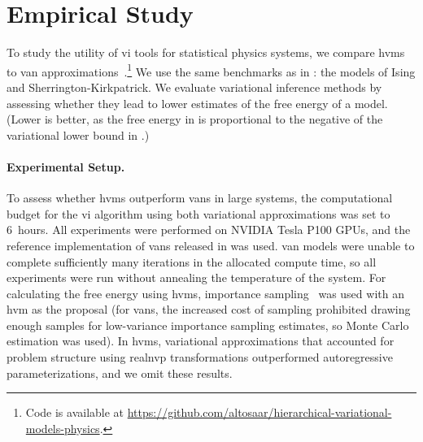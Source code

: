 \section{Empirical Study}
\label{sec:hvm-experiments}

To study the utility of \gls{vi} tools for statistical physics systems, we compare \glspl{hvm} to \gls{van} approximations~\citep{wu2019solving}.\footnote{Code is available at \url{https://github.com/altosaar/hierarchical-variational-models-physics}.} We use the same benchmarks as in \citet{wu2019solving}: the models of Ising and Sherrington-Kirkpatrick. We evaluate variational inference methods by assessing whether they lead to lower estimates of the free energy of a model. (Lower is better, as the free energy in   is proportional to the negative of the variational lower bound in .)

\paragraph{Experimental Setup.} To assess whether \glspl{hvm} outperform \glspl{van} in large systems, the computational budget for the \gls{vi} algorithm using both variational approximations was set to 6~hours.  All experiments were performed on NVIDIA Tesla P100 GPUs, and the reference implementation of \glspl{van} released in \citet{wu2019solving} was used. \gls{van} models were unable to complete sufficiently many iterations in the allocated compute time, so all experiments were run without annealing the temperature of the system. For calculating the free energy using \glspl{hvm}, importance sampling~\citep{owen2013monte} was used with an \gls{hvm} as the proposal (for \glspl{van}, the increased cost of sampling prohibited drawing enough samples for low-variance importance sampling estimates, so Monte Carlo estimation was used). In \glspl{hvm}, variational approximations that accounted for problem structure using \gls{realnvp} transformations outperformed autoregressive parameterizations, and we omit these results.

